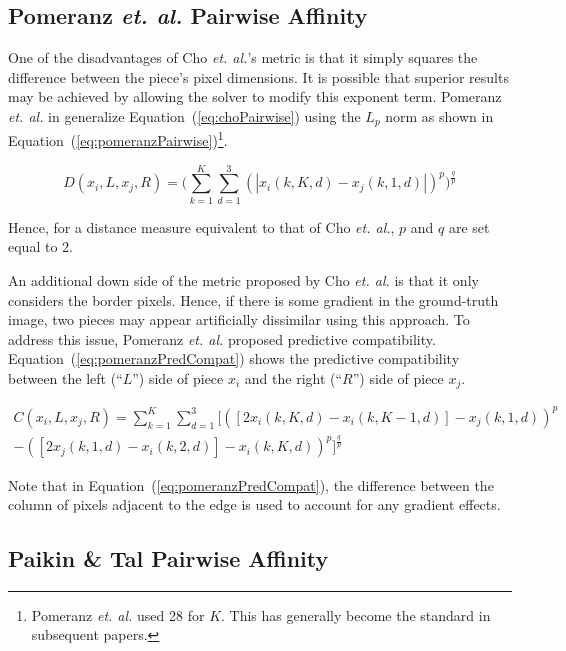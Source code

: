 \documentclass{report}
\def\eref#1{(\ref{#1})}
\begin{document}
\subsection{Pomeranz \textit{et. al.} Pairwise Affinity}\label{sec:pomeranzPairwiseAffinity}

One of the disadvantages of Cho \textit{et. al.}'s metric is that it simply squares the difference between the piece's pixel dimensions.  It is possible that superior results may be achieved by allowing the solver to modify this exponent term.  Pomeranz \textit{et. al.} in \cite{pomeranz2011} generalize Equation~\eref{eq:choPairwise} using the $L_p$ norm as shown in Equation~\eref{eq:pomeranzPairwise}\footnote{Pomeranz \textit{et. al.} used 28 for $K$.  This has generally become the standard in subsequent papers.}.

\begin{equation} \label{eq:pomeranzPairwise}
D(x_i,L,x_j,R) = \bigg(\sum_{k=1}^{K}\sum_{d=1}^{3}(|x_i(k,K,d) - x_j(k,1,d)|)^p\bigg)^{\frac{q}{p}}
\end{equation}

Hence, for a distance measure equivalent to that of Cho \textit{et. al.}, $p$ and $q$ are set equal to $2$.

An additional down side of the metric proposed by Cho \textit{et. al.} is that it only considers the border pixels.  Hence, if there is some gradient in the ground-truth image, two pieces may appear artificially dissimilar using this approach.  To address this issue, Pomeranz \textit{et. al.} proposed predictive compatibility.  Equation~\eref{eq:pomeranzPredCompat} shows the predictive compatibility between the left (``$L$'') side of piece $x_i$ and the right (``$R$'') side of piece $x_j$.  

\begin{equation} \label{eq:pomeranzPredCompat}
\begin{split}
C(x_i,L,x_j,R) = \sum_{k=1}^{K}\sum_{d=1}^{3}\Big[ ([2x_i(k, K, d) - x_i(k, K-1, d)] - x_j(k, 1, d))^p \\ - ([2x_j(k, 1, d) - x_i(k, 2, d)] - x_i(k, K, d))^p\Big]^{\frac{q}{p}}
\end{split}
\end{equation}

Note that in Equation~\eref{eq:pomeranzPredCompat}, the difference between the column of pixels adjacent to the edge is used to account for any gradient effects.

\subsection{Paikin \& Tal Pairwise Affinity}\label{sec:paikinPairwiseAffinity}
\end{document}
